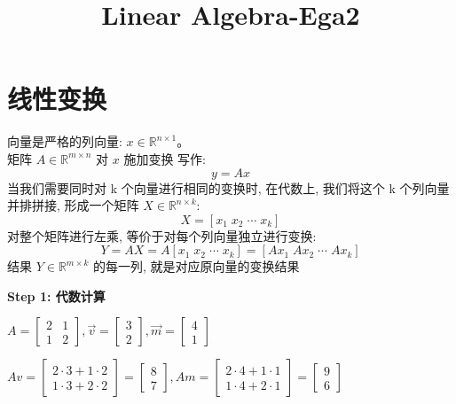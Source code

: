 \documentclass[12pt]{article}
\title{Linear Algebra-Ega2}
\date{}
\begin{document}
\maketitle
\newcommand{\step}[1]{\par\vspace{0.5em}\noindent\textbf{#1}\par}

\section{线性变换}
向量是严格的列向量: $ x \in \mathbb{R}^{n \times 1}。$ \\
矩阵 $ A \in \mathbb{R}^{m \times n}$ 对 $x$ 施加变换 写作:
\[
    y =Ax
\]
当我们需要同时对 k 个向量进行相同的变换时, 在代数上, 我们将这个 k 个列向量并排拼接, 形成一个矩阵 $X \in \mathbb{R}^{n \times k}$: \\
\[
    X = [x_{1} \;  x_{2} \; \cdots \;x_{k}]
\]
对整个矩阵进行左乘, 等价于对每个列向量独立进行变换: \\
\[
    Y =  AX  =  A[x_{1} \;  x_{2} \;  \cdots \; x_{k}] = [Ax_{1} \; Ax_{2} \; \cdots \; Ax_{k}]
\]
结果 $Y \in \mathbb{R}^{m \times k}$ 的每一列, 就是对应原向量的变换结果 \\

\step{Step 1: 代数计算}

$A = \begin{bmatrix}
        2 & 1 \\
        1 & 2
    \end{bmatrix},\vec{v} = \begin{bmatrix}
        3 \\
        2
    \end{bmatrix},\vec{m} = \begin{bmatrix}
        4 \\
        1
    \end{bmatrix}$

$ Av = \begin{bmatrix}
        2 \cdot 3 + 1 \cdot 2 \\
        1 \cdot 3 + 2 \cdot 2
    \end{bmatrix} = \begin{bmatrix}
        8 \\
        7
    \end{bmatrix}, Am = \begin{bmatrix}
        2 \cdot 4 + 1 \cdot 1 \\
        1 \cdot 4 + 2 \cdot 1
    \end{bmatrix} = \begin{bmatrix}
        9 \\
        6
    \end{bmatrix} $
\end{document}
